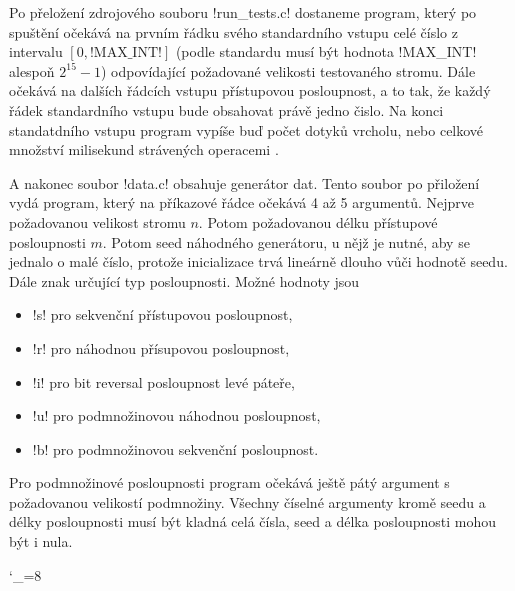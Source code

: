 Po přeložení zdrojového souboru !run_tests.c! dostaneme program, který po
spuštění očekává na prvním řádku svého standardního vstupu celé číslo z
intervalu $[0, \text{!MAX_INT!}]$ (podle standardu musí být hodnota !MAX_INT!
alespoň $2^{15}-1$) odpovídající požadované velikosti testovaného stromu. Dále
očekává na dalších řádcích vstupu přístupovou posloupnost, a to tak, že každý
řádek standardního vstupu bude obsahovat právě jedno čislo. Na konci
standatdního vstupu program vypíše buď počet dotyků vrcholu, nebo celkové
množství milisekund strávených operacemi .

A nakonec soubor !data.c! obsahuje generátor dat. Tento soubor po přiložení vydá program, který na příkazové řádce očekává 4 až 5 argumentů. Nejprve požadovanou velikost stromu $n$. Potom požadovanou délku přístupové posloupnosti $m$. Potom seed náhodného generátoru, u nějž je nutné, aby se jednalo o malé číslo, protože inicializace trvá lineárně dlouho vůči hodnotě seedu. Dále znak určující typ posloupnosti. Možné hodnoty jsou

\begin{itemize}
\item !s! pro sekvenční přístupovou posloupnost,
\item !r! pro náhodnou přísupovou posloupnost,
\item !i! pro bit reversal posloupnost levé páteře,
\item !u! pro podmnožinovou náhodnou posloupnost,
\item !b! pro podmnožinovou sekvenční posloupnost.
\end{itemize}

Pro podmnožinové posloupnosti program očekává ještě pátý argument s požadovanou velikostí podmnožiny. Všechny číselné argumenty kromě seedu a délky posloupnosti musí být kladná celá čísla, seed a délka posloupnosti mohou být i nula.

\catcode`_=8

